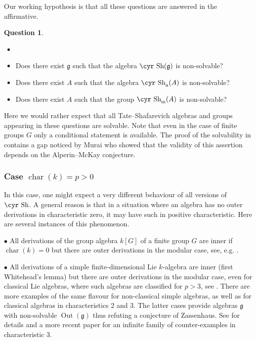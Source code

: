\documentclass[11pt,reqno]{amsart}
\numberwithin{equation}{section}
\theoremstyle{definition}
\newtheorem{question}[theorem]{Question}
\newcommand{\ch}{{\operatorname{char}}}
\newcommand{\Out}{{\operatorname{ Out}}}
\def\Sha{\text{\cyr Sh}}
\def\g{\mathfrak g}
\begin{document}
Our working hypothesis is that all these questions are answered in the affirmative.



\begin{question} \label{q}
\begin{itemize}
\item[]
\item[(i)] Does there exist $\g$ such that the algebra $\Sha (\g)$ is non-solvable?
\item[(ii)] Does there exist $A$ such that the algebra $\Sha_{\rm{a}}(A)$ is non-solvable?
\item[(iii)] Does there exist $A$ such that the group $\Sha_{\rm{m}}(A)$ is non-solvable?
\end{itemize}
\end{question}

Here we would rather expect that all Tate--Shafarevich algebras and groups appearing in these
questions are solvable. Note that even in the case of finite groups $G$ only a conditional
statement is available. The proof of the solvability in \cite{Sah} contains a gap noticed
by Murai \cite{Mu} who showed that the validity of this assertion depends on the Alperin--McKay conjecture.


\subsubsection{Case $\ch (k)=p>0$}
In this case, one might expect a very different behaviour of all versions of $\Sha$.
A general reason is that in a situation where an algebra has no outer derivations
in characteristic zero, it may have such in positive characteristic. Here are several
instances of this phenomenon.

$\bullet$ All derivations of the group algebra $k[G]$ of a finite group $G$ are inner
if $\ch (k)=0$ but there are outer derivations in the modular case, see, e.g. \cite{ArKo}.

$\bullet$ All derivations of a simple finite-dimensional Lie $k$-algebra are inner
(first Whitehead's lemma) but there are outer derivations in the modular case, even
for classical Lie algebras, where such algebras are classified for $p>3$, see \cite[Lemma~2.7]{BGP}.
There are more examples of the same flavour for non-classical simple algebras, as well as
for classical algebras in characteristics 2 and 3. The latter cases provide algebras $\g$
with non-solvable $\Out(\g)$ thus refuting a conjecture of Zassenhaus. See \cite{BM}
for details and a more recent paper \cite{BMPG} for an infinite family of counter-examples
in characteristic 3.
\end{document}
